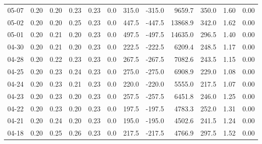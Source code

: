 \begin{threeparttable}
{\begin{tabular}{lrrrrrrrrrrr}
  05-07 &          0.20 &          0.20 &          0.23 &        0.23 &                 0.0 &               315.0 &     -315.0 &              9659.7 &            350.0 &            1.60 &                   0.00 \\
  05-02 &          0.20 &          0.20 &          0.25 &        0.23 &                 0.0 &               447.5 &     -447.5 &             13868.9 &            342.0 &            1.62 &                   0.00 \\
  05-01 &          0.20 &          0.21 &          0.20 &        0.23 &                 0.0 &               497.5 &     -497.5 &             14635.0 &            296.5 &            1.40 &                   0.00 \\
  04-30 &          0.20 &          0.21 &          0.20 &        0.23 &                 0.0 &               222.5 &     -222.5 &              6209.4 &            248.5 &            1.17 &                   0.00 \\
  04-28 &          0.20 &          0.22 &          0.23 &        0.23 &                 0.0 &               267.5 &     -267.5 &              7082.6 &            243.5 &            1.15 &                   0.00 \\
  04-25 &          0.20 &          0.23 &          0.24 &        0.23 &                 0.0 &               275.0 &     -275.0 &              6908.9 &            229.0 &            1.08 &                   0.00 \\
  04-24 &          0.20 &          0.23 &          0.21 &        0.23 &                 0.0 &               220.0 &     -220.0 &              5555.0 &            217.5 &            1.07 &                   0.00 \\
  04-23 &          0.20 &          0.23 &          0.20 &        0.23 &                 0.0 &               257.5 &     -257.5 &              6451.8 &            246.0 &            1.25 &                   0.00 \\
  04-22 &          0.20 &          0.23 &          0.20 &        0.23 &                 0.0 &               197.5 &     -197.5 &              4783.3 &            252.0 &            1.31 &                   0.00 \\
  04-21 &          0.20 &          0.24 &          0.20 &        0.23 &                 0.0 &               195.0 &     -195.0 &              4502.6 &            241.5 &            1.24 &                   0.00 \\
  04-18 &          0.20 &          0.25 &          0.26 &        0.23 &                 0.0 &               217.5 &     -217.5 &              4766.9 &            297.5 &            1.52 &                   0.00 \\

\end{tabular}}
\end{threeparttable}
